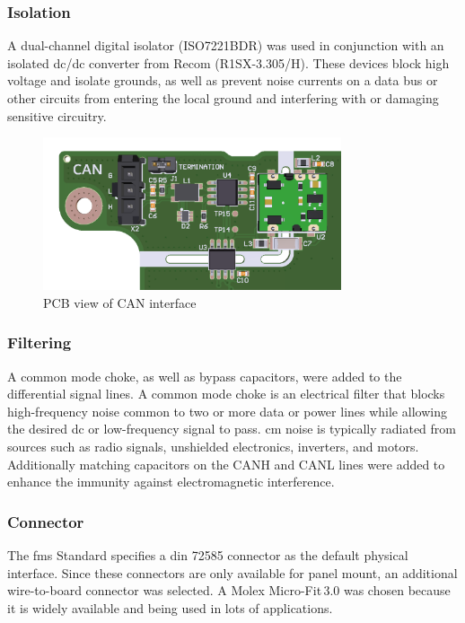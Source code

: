 \subsubsection{Isolation}
A dual-channel digital isolator (ISO7221BDR) was used in conjunction with an isolated \acrshort{dc}/\acrshort{dc} converter from Recom (R1SX-3.305/H). These devices block high voltage and isolate grounds, as well as prevent noise currents on a data bus or other circuits from entering the local ground and interfering with or damaging sensitive circuitry.

\begin{figure}[h!]
	\centering
	\includegraphics[height=4.5cm]{images/can-pcb}
	\caption{PCB view of CAN interface}
	\label{fig:can-pcb}
\end{figure}

\subsubsection{Filtering}
A common mode choke, as well as bypass capacitors, were added to the differential signal lines. A common mode choke is an electrical filter that blocks high-frequency noise common to two or more data or power lines while allowing the desired \acrshort{dc} or low-frequency signal to pass. \acrfull{cm} noise is typically radiated from sources such as radio signals, unshielded electronics, inverters, and motors. Additionally matching capacitors on the CANH and CANL lines were added to enhance the immunity against electromagnetic interference. 

\subsubsection{Connector}
The \acrshort{fms} Standard specifies a \acrshort{din} 72585 connector as the default physical interface. Since these connectors are only available for panel mount, an additional wire-to-board connector was selected. A Molex Micro-Fit\,3.0 was chosen because it is widely available and being used in lots of applications.

